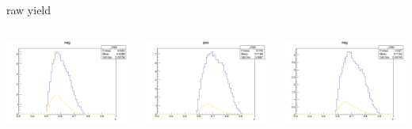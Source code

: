 \begin{frame}{raw yield}
\begin{columns}
\begin{column}[T]{0.25\textwidth}
\includegraphics[width = \textwidth]{results/yield/statistics/yield_x_Q2_z_0.50_5.000_0.60_neg.png}
\end{column}
\begin{column}[T]{0.25\textwidth}
\includegraphics[width = \textwidth]{results/yield/statistics/yield_x_Q2_z_0.50_5.000_0.70_pos.png}
\end{column}
\begin{column}[T]{0.25\textwidth}
\includegraphics[width = \textwidth]{results/yield/statistics/yield_x_Q2_z_0.50_5.000_0.70_neg.png}
\end{column}
\end{columns}
\end{frame}

